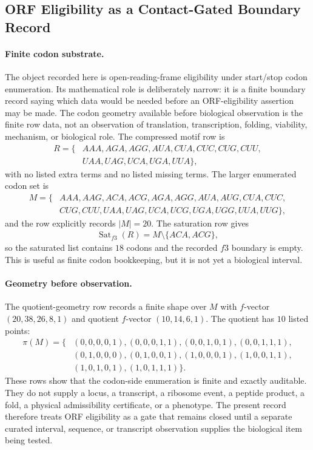 \subsection{ORF Eligibility as a Contact-Gated Boundary Record}\label{sec:b reality-orf-eligibility-seed-boundary}

\paragraph{Finite codon substrate.}
The object recorded here is open-reading-frame eligibility under start/stop codon enumeration.  Its mathematical role is deliberately narrow: it is a finite boundary record saying which data would be needed before an ORF-eligibility assertion may be made.  The codon geometry available before biological observation is the finite row data, not an observation of translation, transcription, folding, viability, mechanism, or biological role.  The compressed motif row is
$$
\begin{aligned}
R=\{&AAA, AGA, AGG, AUA, CUA, CUC, CUG, CUU,\\
&UAA, UAG, UCA, UGA, UUA\},
\end{aligned}
$$
with no listed extra terms and no listed missing terms.  The larger enumerated codon set is
$$
\begin{aligned}
M=\{&AAA, AAG, ACA, ACG, AGA, AGG, AUA, AUG, CUA, CUC,\\
&CUG, CUU, UAA, UAG, UCA, UCG, UGA, UGG, UUA, UUG\},
\end{aligned}
$$
and the row explicitly records $|M|=20$.  The saturation row gives
$$
\begin{aligned}
\operatorname{Sat}_{f3}(R)=M\setminus\{ACA,ACG\},
\end{aligned}
$$
so the saturated list contains $18$ codons and the recorded $f3$ boundary is empty.  This is useful as finite codon bookkeeping, but it is not yet a biological interval.

\paragraph{Geometry before observation.}
The quotient-geometry row records a finite shape over $M$ with $f$-vector $(20,38,26,8,1)$ and quotient $f$-vector $(10,14,6,1)$.  The quotient has $10$ listed points:
$$
\begin{aligned}
\pi(M)=\{&(0,0,0,0,1),(0,0,0,1,1),(0,0,1,0,1),(0,0,1,1,1),\\
&(0,1,0,0,0),(0,1,0,0,1),(1,0,0,0,1),(1,0,0,1,1),\\
&(1,0,1,0,1),(1,0,1,1,1)\}.
\end{aligned}
$$
These rows show that the codon-side enumeration is finite and exactly auditable.  They do not supply a locus, a transcript, a ribosome event, a peptide product, a fold, a physical admissibility certificate, or a phenotype.  The present record therefore treats ORF eligibility as a gate that remains closed until a separate curated interval, sequence, or transcript observation supplies the biological item being tested.

